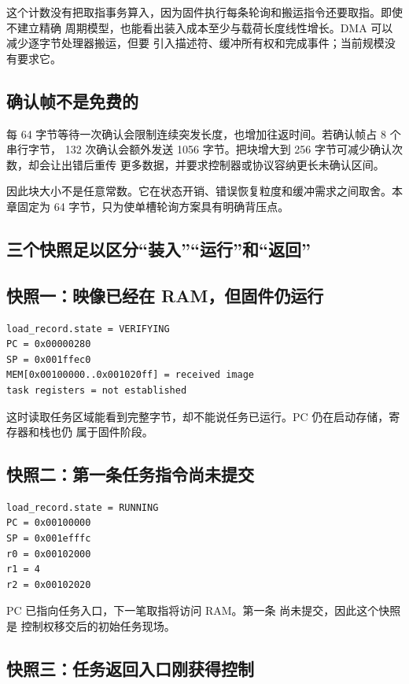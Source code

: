 这个计数没有把取指事务算入，因为固件执行每条轮询和搬运指令还要取指。即使不建立精确
周期模型，也能看出装入成本至少与载荷长度线性增长。DMA 可以减少逐字节处理器搬运，但要
引入描述符、缓冲所有权和完成事件；当前规模没有要求它。

\subsection{确认帧不是免费的}

每 64 字节等待一次确认会限制连续突发长度，也增加往返时间。若确认帧占 8 个串行字节，
132 次确认会额外发送 1056 字节。把块增大到 256 字节可减少确认次数，却会让出错后重传
更多数据，并要求控制器或协议容纳更长未确认区间。

因此块大小不是任意常数。它在状态开销、错误恢复粒度和缓冲需求之间取舍。本章固定为
64 字节，只为使单槽轮询方案具有明确背压点。

\subsection{三个快照足以区分“装入”“运行”和“返回”}

\subsection{快照一：映像已经在 RAM，但固件仍运行}

\begin{lstlisting}
load_record.state = VERIFYING
PC = 0x00000280
SP = 0x001ffec0
MEM[0x00100000..0x001020ff] = received image
task registers = not established
\end{lstlisting}

这时读取任务区域能看到完整字节，却不能说任务已运行。PC 仍在启动存储，寄存器和栈也仍
属于固件阶段。

\subsection{快照二：第一条任务指令尚未提交}

\begin{lstlisting}
load_record.state = RUNNING
PC = 0x00100000
SP = 0x001efffc
r0 = 0x00102000
r1 = 4
r2 = 0x00102020
\end{lstlisting}

PC 已指向任务入口，下一笔取指将访问 RAM。第一条  尚未提交，因此这个快照是
控制权移交后的初始任务现场。

\subsection{快照三：任务返回入口刚获得控制}

